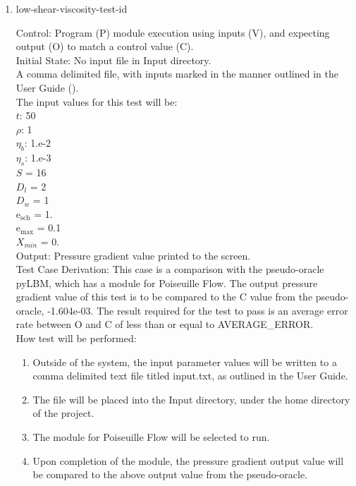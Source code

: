 \documentclass[12pt, titlepage]{article}
\newcounter{testcounter} %
\begin{document}
\begin{enumerate}
\item{low-shear-viscosity-test-id\thetestcounter \\}

Control: Program (P) module execution using inputs (V), and expecting output (O) to match a control value (C).\\
					
Initial State: No input file in Input directory.\\
					
A comma delimited file, with inputs marked in the manner outlined in the User
Guide (\citet{LBM_UserGuide_PM}).\\The input values for this test will be:\\
$t$: 50\\
$\rho$: 1\\
$\eta_b$: 1.e-2\\
$\eta_s$: 1.e-3\\
$S$ = 16\\
$D_{l}$ = 2\\
$D_{w}$ = 1\\
$\mathrm{e_{sch}}$ = 1.\\
$\mathrm{e_{max}}$ = 0.1\\
$X_{min}$ = 0.\\

Output: Pressure gradient value printed to the screen. \\ 

Test Case Derivation: This case is a comparison with the pseudo-oracle pyLBM,
which has a module for Poiseuille Flow. The output pressure gradient value of
this test is to be compared to the C value from the pseudo-oracle,
-1.604e-03. The result required for the test to pass is an average error rate
between O and C of less than or equal to AVERAGE\_ERROR.\\
					
How test will be performed: 

\begin{enumerate}
\item Outside of the system, the input parameter values will be written to a comma delimited text file titled input.txt, as outlined in the User Guide.
\item The file will be placed into the Input directory, under the home directory of the project.
\item The module for Poiseuille Flow will be selected to run.
\item Upon completion of the module, the pressure gradient output value will be compared to the above output value from the pseudo-oracle.
\end{enumerate}	


\end{enumerate}
\end{document}
